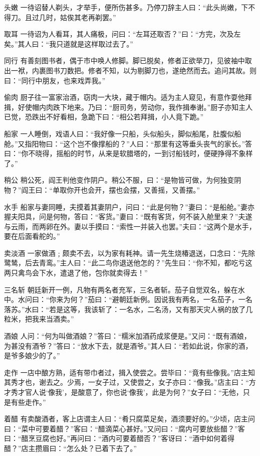 \documentclass[12pt,UTF8]{ctexbook}
\begin{document}
头嫩
一待诏替人剃头，才举手，便所伤甚多。乃停刀辞主人曰：“此头尚嫩，下不得刀。且过几时，姑俟其老再剃罢。”

取耳
一待诏为人看耳，其人痛极，问曰：“左耳还取否？”曰：“方完，次及左矣。”其人曰：“我只道就是这样取过去了。”

同行
有善刻图书者，偶于市中唤人修脚。脚已脱矣，修者正欲举刀，见彼袖中取出一袱，内裹图书刀数把。修者不知，以为剔脚刀也，遂绝然而去。追问其故。则曰：“同行中朋友，也来戏弄我。”

偷肉
厨子往一富家治酒，窃肉一大块，藏于帽内。适为主人窥见，有意作耍他拜揖，好使帽内肉跌下地来。乃曰：“厨司务，劳动你，我作揖奉谢。”厨子亦知主人已觉，恐跌出不好看相，急跪下曰：“相公若拜揖，小人竟下跪。”

船家
一人睡倒，戏语人曰：“我好像一只船，头似船头，脚似船尾，肚腹似船舱。”又指阳物曰：“这个岂不像撑船的？”人曰：“那里有这等垂头丧气的家长。”答曰：“你不晓得，摇船的时节，从来是软腊塔的，一到讨船钱时，便硬挣得不象样了。”

稍公
稍公死，阎王判他变作阴户。稍公不服，曰：“是物皆可做，为何独变阴物？”阎王曰：“单取你开也会开，摆也会摆，又善摇，又善摆。”

水手
船家与妻同睡，夫摸着其妻阴户，问曰：“此是何物？”妻曰：“是船舱。”妻亦握夫阳具，问是何物，答曰：“客货。”妻曰：“既有客货，何不装入舱里来？”夫遂与云雨，而两卵在外。妻以手摸曰：“索性一并装入也罢。”夫曰：“这两个是水手，要在后面看舵的。”

卖淡酒
一家做酒﹔颇卖不去，以为家有耗神。请一先生烧椿退送，口念曰：“先除鹭鸶，后去青鸾。”主人曰：“此二鸟你退送他怎的？”先生曰：“你不知，都吃亏这两只禽鸟会下水，遣退了他，包你就卖得去！”

三名斩
朝廷新开一例，凡物有两名者充军，三名者斩。茄子自觉双名，躲在水中。水问曰：“你来为何？”茄曰：“避朝廷新例。因说我有两名，一名茄子，一名落苏。”水曰：“若是这等，我该斩了：一名水，二名汤，又有那天灾人祸的放了几粒米，把我来当酒卖。”

酒娘
人问：“何为叫做酒娘？”答曰：“糯米加酒药成浆便是。”又问：“既有酒娘，为甚没有酒爷？”答曰：“放水下去，就是酒爷。”其人曰：“若如此说，你家的酒，是爷多娘少的了。”

走作
一店中酿方熟，适有带巾者过，揖入使尝之。尝毕曰：“竟有些像我。”店主知其秀才也，谢去之。少焉，一女子过，又使尝之，女子亦曰：“像我。”店主曰：“方才秀才官人说‘像我’，是酸意了，你也说‘像我’，此是为何？”女子曰：“无他，只是有些走作。”

着醋
有卖酸酒者，客上店谓主人曰：“肴只腐菜足矣，酒须要好的。”少顷，店主问曰：“菜中可要着醋？”客曰：“醋滴菜心甚好。”又问曰：“腐内可要放些醋？”客曰：“醋烹豆腐也好。”再问曰：“酒内可要着醋否？”客讶曰：“酒中如何着得醋？”店主攒眉曰：“怎么处？已着下去了。”
\end{document}
